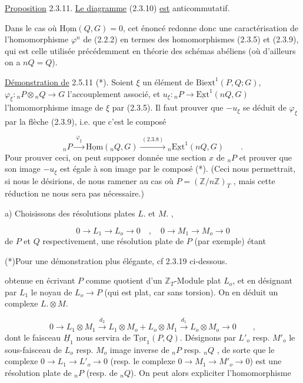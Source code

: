 \underline{Proposition} 2.3.11. \underline{Le diagramme} (2.3.10) \underline{est} anticommutatif.

Dans le cas où $\underline{\mathrm{Hom}}(Q,G) = 0$, cet énoncé redonne donc une caractérisation de l'homomorphisme $\varphi^n$ de (2.2.2) en termes des homomorphismes (2.3.5) et (2.3.9), qui est celle utilisée précédemment en théorie des schémas abéliens (où d'ailleurs on a $nQ = Q$).

\underline{Démonstration de} 2.5.11 (*). Soient $\xi$ un élément de $\mathrm{Biext}^1(P,Q;G)$, $\varphi_\xi : {}_nP \otimes {}_nQ \longrightarrow G$ l'accouplement associé, et $u_\xi : {}_nP \longrightarrow \underline{\mathrm{Ext}}^1(nQ,G)$ l'homomorphisme image de $\xi$ par (2.3.5). Il faut prouver que $-u_\xi$ se déduit de $\varphi_\xi$ par la flèche (2.3.9), i.e. que c'est le composé

\begin{equation}\tag{*}
{}_nP \xrightarrow{\;\varphi_\xi\;} \underline{\mathrm{Hom}}({}_nQ,G) \xrightarrow{\;(2.3.8)\;} {}_n\underline{\mathrm{Ext}}^1(nQ,G) \qquad .
\end{equation}
Pour prouver ceci, on peut supposer donnée une section $x$ de ${}_nP$ et prouver que son image $-u_\xi$ est égale à son image par le composé (*). (Ceci nous permettrait, si nous le désirions, de nous ramener au cas où $P = (\mathbb{Z}/n\mathbb{Z})_T$ , mais cette réduction ne nous sera pas nécessaire.)

a) Choisissons des résolutions plates $L.$ et $M.$ ,

\begin{equation*}
0 \longrightarrow L_1 \longrightarrow L_o \longrightarrow 0 \quad , \quad 0 \longrightarrow M_1 \longrightarrow M_o \longrightarrow 0
\end{equation*}
de $P$ et $Q$ respectivement, une résolution plate de $P$ (par exemple) étant 

(*)\quad Pour une démonstration plus élégante, cf 2.3.19 ci-dessous.



 obtenue en écrivant $P$ comme quotient d'un $\mathbb{Z}_T$-Module plat $L_o$, et en désignant par $L_1$ le noyau de $L_o \longrightarrow P$ (qui est plat, car sans torsion). On en déduit un complexe $L.\otimes M.$

\begin{equation*}
0 \longrightarrow L_1 \otimes M_1 \overset{d_2}{\longrightarrow} L_1 \otimes M_o + L_o \otimes M_1 \overset{d_1}{\longrightarrow} L_o \otimes M_o \longrightarrow 0 \qquad ,
\end{equation*}
dont le faisceau $\underline{H}_1$ nous servira de $\underline{\mathrm{Tor}}_1(P,Q)$. Désignons par $L'_o$ resp. $M'_o$ le sous-faisceau de $L_o$ resp. $M_o$ image inverse de ${}_nP$ resp. ${}_nQ$ , de sorte que le complexe $0 \longrightarrow L_1 \longrightarrow L'_o \longrightarrow 0$ (resp. le complexe $0 \longrightarrow M_1 \longrightarrow M'_o \longrightarrow 0$) est une résolution plate de ${}_nP$ (resp. de ${}_nQ$). On peut alors expliciter l'homomorphisme

